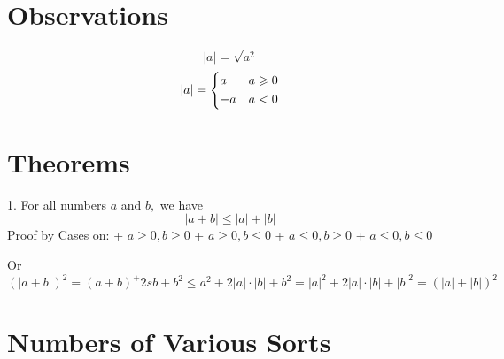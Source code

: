 \documentclass{report}
\begin{document}
\section*{Observations}
$$ |a| = \sqrt{a^2} $$
\begin{equation*}
       |a| =
         \begin{dcases}
            a & a \geq 0 \\
            -a &  a < 0
         \end{dcases}
\end{equation*}

\section*{Theorems}
1. For all numbers $a$ and $b,$ we have
$$|a + b| \leq |a| + |b|$$
  Proof by Cases on:
    + $a \geq 0, b \geq 0$
    + $a \geq 0, b \leq 0$
    + $a \leq 0, b \geq 0$
    + $a \leq 0, b \leq 0$

  Or
  $$(|a + b|)^2 = (a+b)^ + 2sb + b^2
                \leq a^2 + 2|a| \cdot |b| + b^2
                = |a|^2 + 2|a| \cdot|b| + |b|^2
                = (|a| + |b|)^2
  $$

\section{Numbers of Various Sorts}
\end{document}
